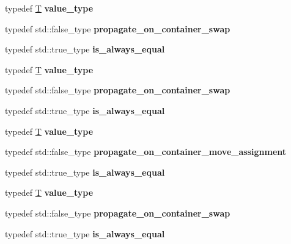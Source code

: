 \begin{DoxyCompactItemize}
typedef \mbox{\hyperlink{struct_t}{T}} {\bfseries value\+\_\+type}
\item 
\mbox{\label{structsome__alloc2_ad1d285ccc9f402a42deed26170af62e9}} 
typedef std\+::false\+\_\+type {\bfseries propagate\+\_\+on\+\_\+container\+\_\+swap}
\item 
\mbox{\label{structsome__alloc2_acc5ede9dcfed27470598992af2c07bfb}} 
typedef std\+::true\+\_\+type {\bfseries is\+\_\+always\+\_\+equal}
\item 
\mbox{\label{structsome__alloc2_ab7bdd83edbd79faad769611dbbd19a5e}} 
typedef \mbox{\hyperlink{struct_t}{T}} {\bfseries value\+\_\+type}
\item 
\mbox{\label{structsome__alloc2_ad1d285ccc9f402a42deed26170af62e9}} 
typedef std\+::false\+\_\+type {\bfseries propagate\+\_\+on\+\_\+container\+\_\+swap}
\item 
\mbox{\label{structsome__alloc2_acc5ede9dcfed27470598992af2c07bfb}} 
typedef std\+::true\+\_\+type {\bfseries is\+\_\+always\+\_\+equal}
\item 
\mbox{\label{structsome__alloc2_ab7bdd83edbd79faad769611dbbd19a5e}} 
typedef \mbox{\hyperlink{struct_t}{T}} {\bfseries value\+\_\+type}
\item 
\mbox{\label{structsome__alloc2_a2bb8a30b2f6202260c0f4935a01bd5ad}} 
typedef std\+::false\+\_\+type {\bfseries propagate\+\_\+on\+\_\+container\+\_\+move\+\_\+assignment}
\item 
\mbox{\label{structsome__alloc2_acc5ede9dcfed27470598992af2c07bfb}} 
typedef std\+::true\+\_\+type {\bfseries is\+\_\+always\+\_\+equal}
\item 
\mbox{\label{structsome__alloc2_ab7bdd83edbd79faad769611dbbd19a5e}} 
typedef \mbox{\hyperlink{struct_t}{T}} {\bfseries value\+\_\+type}
\item 
\mbox{\label{structsome__alloc2_ad1d285ccc9f402a42deed26170af62e9}} 
typedef std\+::false\+\_\+type {\bfseries propagate\+\_\+on\+\_\+container\+\_\+swap}
\item 
\mbox{\label{structsome__alloc2_acc5ede9dcfed27470598992af2c07bfb}} 
typedef std\+::true\+\_\+type {\bfseries is\+\_\+always\+\_\+equal}
\end{DoxyCompactItemize}
